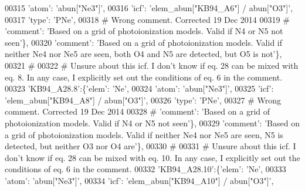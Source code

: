 \begin{DoxyCode}
00315                                        \textcolor{stringliteral}{'atom'}: \textcolor{stringliteral}{'abun["Ne3"]'},
00316                                        \textcolor{stringliteral}{'icf'}: \textcolor{stringliteral}{'elem\_abun["KB94\_A6"]  / abun["O3"]'},
00317                                       \textcolor{stringliteral}{'type'}: \textcolor{stringliteral}{'PNe'},
00318 \textcolor{comment}{# Wrong comment. Corrected 19 Dec 2014}
00319 \textcolor{comment}{#                                      'comment': 'Based on a grid of photoionization models. Valid if N4
       or N5 not seen'\},}
00320                                       \textcolor{stringliteral}{'comment'}: \textcolor{stringliteral}{'Based on a grid of photoionization models. Valid if
       neither Ne4 nor Ne5 are seen, both O4 and N5 are detected, but O5 is not'}\},
00321 \textcolor{comment}{#}
00322 \textcolor{comment}{# Unsure about this icf. I don't know if eq. 28 can be mixed with eq. 8. In any case, I explicitly set out
       the conditions of eq. 6 in the comment.}
00323                          \textcolor{stringliteral}{'KB94\_A28.8'}:\{\textcolor{stringliteral}{'elem'}: \textcolor{stringliteral}{'Ne'},
00324                                      \textcolor{stringliteral}{'atom'}: \textcolor{stringliteral}{'abun["Ne3"]'},
00325                                      \textcolor{stringliteral}{'icf'}: \textcolor{stringliteral}{'elem\_abun["KB94\_A8"]  / abun["O3"]'},
00326                                       \textcolor{stringliteral}{'type'}: \textcolor{stringliteral}{'PNe'},
00327 \textcolor{comment}{# Wrong comment. Corrected 19 Dec 2014}
00328 \textcolor{comment}{#                                      'comment': 'Based on a grid of photoionization models. Valid if N4
       or N5 not seen'\},}
00329                                       \textcolor{stringliteral}{'comment'}: \textcolor{stringliteral}{'Based on a grid of photoionization models. Valid if
       neither Ne4 nor Ne5 are seen, N5 is detected, but neither O3 nor O4 are'}\},
00330 \textcolor{comment}{#}
00331 \textcolor{comment}{# Unsure about this icf. I don't know if eq. 28 can be mixed with eq. 10. In any case, I explicitly set out
       the conditions of eq. 6 in the comment.}
00332                          \textcolor{stringliteral}{'KB94\_A28.10'}:\{\textcolor{stringliteral}{'elem'}: \textcolor{stringliteral}{'Ne'},
00333                                      \textcolor{stringliteral}{'atom'}: \textcolor{stringliteral}{'abun["Ne3"]'},
00334                                      \textcolor{stringliteral}{'icf'}: \textcolor{stringliteral}{'elem\_abun["KB94\_A10"]  / abun["O3"]'},

\end{DoxyCode}
